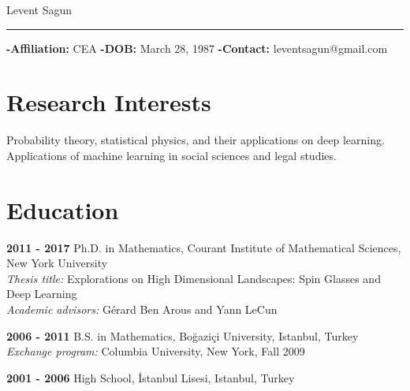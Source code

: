 \documentclass[10pt,letterpaper]{article}
\renewenvironment{itemize}
{
\begin{list}{}{\setlength{\leftmargin}{1.5em}}
}
{
  \end{list}
}
\begin{document}
{\huge Levent Sagun}

\noindent\rule{6.7in}{0.4pt}

\textbf{ -Affiliation:} CEA \textbf{ -DOB:} March 28, 1987 \textbf{ -Contact:} leventsagun@gmail.com

\section*{Research Interests}
\begin{itemize}
\item Probability theory, statistical physics, and their applications on deep learning. \\ 
Applications of machine learning in social sciences and legal studies.
\end{itemize}

\section*{Education}
\begin{itemize}
\item \textbf{2011 - 2017 } Ph.D. in Mathematics, Courant Institute of Mathematical Sciences, New York University \\ 
  \hspace*{2cm} \textit{Thesis title: }{Explorations on High Dimensional Landscapes: Spin Glasses and Deep Learning} \\
  \hspace*{2cm} \textit{Academic advisors: }{G\'erard Ben Arous and Yann LeCun}

\item \textbf{2006 - 2011 } B.S. in Mathematics, Bo\u{g}azi\c{c}i University, Istanbul, Turkey \\
    \hspace*{2cm} \textit{Exchange program: }{Columbia University, New York, Fall 2009} %
 
\item \textbf{2001 - 2006 } High School, \.{I}stanbul Lisesi, Istanbul, Turkey%

\end{itemize}
\end{document}
